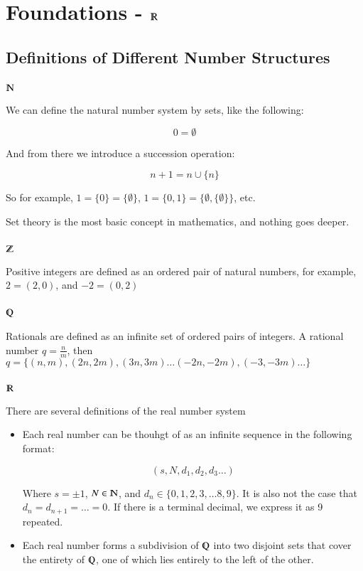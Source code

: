 \documentclass [12 pt, twoside] {book}
\newcommand\+{\text{ }}
\begin{document}
\section{Foundations - $\varmathbb{R}$}

\subsection{Definitions of Different Number Structures}
\subsubsection{$\varmathbb{N}$}
We can define the natural number system by sets, like the following:

$$0 = \emptyset$$

\noindent And from there we introduce a succession operation:

$$n + 1 = n \cup \{n\}$$

\noindent So for example, $1 = \{0\} = \{\emptyset\}$, $1 = \{0, 1\} = \{\emptyset,
\{\emptyset\}\}$, etc.

\noindent Set theory is the most basic concept in mathematics, and nothing goes deeper.

\subsubsection{$\varmathbb{Z}$}
Positive integers are defined as an ordered pair of natural numbers, for
example, $2 = (2, 0)$, and $-2 = (0, 2)$

\subsubsection{$\varmathbb{Q}$}
Rationals are defined as an infinite set of ordered pairs of integers.
A rational number $q = \frac{n}{m}$, then $q = \{(n, m), (2n, 2m), (3n, 3m)
\dots (-2n, -2m), (-3, -3m) \dots\}$

\subsubsection{$\varmathbb{R}$}

There are several definitions of the real number system
\begin{itemize}
    \item Each real number can be thouhgt of as an infinite sequence in the
        following format:

        $$(s, N, d_1, d_2, d_3 \dots)$$

        Where $s = \pm 1$, $N \in \varmathbb{N}$, and $d_n \in \{0, 1, 2, 3,
        \dots 8, 9\}$. It is also not the case that $d_n = d_{n+1} = \dots = 0$.
        If there is a terminal decimal, we express it as 9 repeated.
    \item Each real number forms a subdivision of $\varmathbb{Q}$ into two
        disjoint sets that cover the entirety of $\varmathbb{Q}$, one of which
        lies entirely to the left of the other.
\end{itemize}
\end{document}
